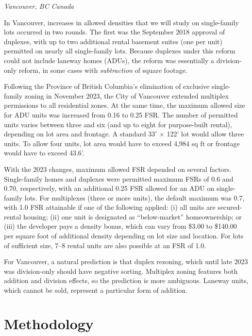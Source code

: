 \documentclass[12pt]{article}
\begin{document}
\textit{Vancouver, BC Canada}

In Vancouver, increases in allowed densities that we will study on
single-family lots occurred in two rounds. The first was the September 2018
approval of duplexes, with up to two additional rental basement suites (one per
unit) permitted on nearly all single-family lots. Because duplexes under this
reform could not include laneway homes (ADUs), the reform was essentially a
division-only reform, in some cases with \emph{subtraction} of square footage.

Following the Province of British Columbia’s elimination of exclusive
single-family zoning in November 2023, the City of Vancouver extended multiplex
permissions to all residential zones. At the same time, the maximum allowed
size for ADU units was increased from 0.16 to 0.25 FSR. The number of permitted
units varies between three and six (and up to eight for purpose-built rental),
depending on lot area and frontage. A standard 33’ × 122’ lot would allow three
units. To allow four units, lot area would have to exceed 4,984 sq ft or
frontage would have to exceed 43.6’.

With the 2023 changes, maximum allowed FSR depended on several factors.
Single-family homes and duplexes were permitted maximum FSRs of 0.6 and 0.70,
respectively, with an additional 0.25 FSR allowed for an ADU on single-family
lots. For multiplexes (three or more units), the default maximum was 0.7, with
1.0 FSR attainable if one of the following applied: (i) all units are
secured-rental housing; (ii) one unit is designated as ``below-market''
homeownership; or (iii) the developer pays a density bonus, which can vary from
\$3.00 to \$140.00 per square foot of additional density depending on lot size
and location. For lots of sufficient size, 7–8 rental units are also possible
at an FSR of 1.0.

For Vancouver, a natural prediction is that duplex rezoning, which until late
2023 was division-only should have negative sorting. Multiplex zoning features
both addition and division effects, so the prediction is more ambiguous.
Laneway units, which cannot be sold, represent a particular form of addition. 

\section{Methodology}
\end{document}
